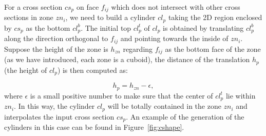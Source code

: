 For a cross section $cs_p$ on face $f_{ij}$ which does  not
intersect with other cross sections in zone $zn_i$, we need to build
a cylinder $cl_p$ taking the 2D region enclosed by $cs_p$ as the
bottom $cl_p^b$. The initial top $cl_p^t$ of $cl_p$ is obtained by
translating $cl_p^b$ along the direction orthogonal to $f_{ij}$ and
pointing towards the inside of $zn_i$. Suppose the height of the
zone is $h_{zn}$ regarding $f_{ij}$ as the bottom face of the zone
(as we have introduced, each zone is a cuboid), the distance of the
translation $h_p$ (the height of $cl_p$) is then computed as:

\begin{equation}
\label{eq:clheight}
h_p = h_{zn}- \epsilon,
\end{equation}
where $\epsilon$ is a small positive number to make sure that the
center of $cl_p^t$ lie within $zn_i$. In this way, the cylinder
$cl_p$ will be totally contained in the zone $zn_i$ and interpolates
the input cross section $cs_p$. An example of the generation of the
cylinders in this case can be found in Figure~\ref{fig:cshape}.


